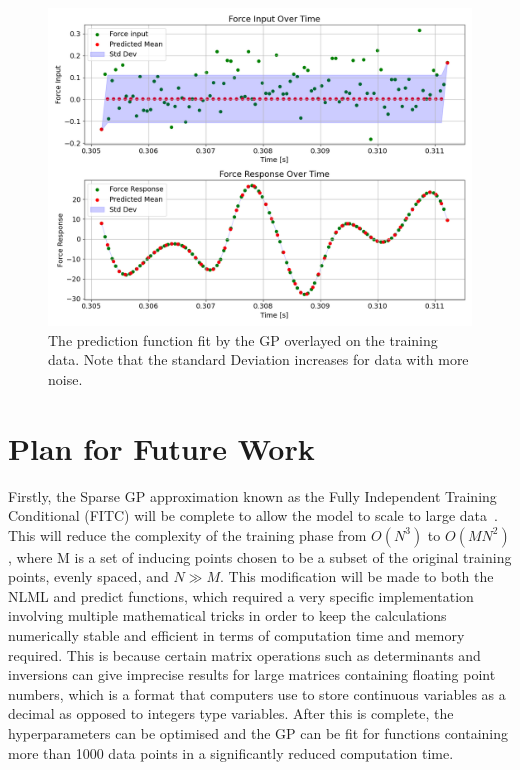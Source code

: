 \documentclass[12pt]{article}
\begin{document}
    \begin{figure}[ht]
        \centering
        \includegraphics[width=1.0\linewidth]{figures/input-response-predict/input-response-predict.png}
        \caption{The prediction function fit by the GP overlayed on the training data. Note that the standard Deviation increases for data with more noise.}
        \label{fig:input-response-predict}
    \end{figure}

    \section{Plan for Future Work}
    Firstly, the Sparse GP approximation known as the Fully Independent Training Conditional (FITC) will be complete to allow the model to scale to large data~\cite{q-candela}.
    This will reduce the complexity of the training phase from $O(N^3)$ to $O(MN^2)$, where M is a set of inducing points chosen to be a subset of the original training points, evenly spaced, and $N \gg M$.  
    This modification will be made to both the NLML and predict functions, which required a very specific implementation involving multiple mathematical tricks in order to keep the calculations numerically stable and efficient in terms of computation time and memory required.
    This is because certain matrix operations such as determinants and inversions can give imprecise results for large matrices containing floating point numbers, which is a format that computers use to store continuous variables as a decimal as opposed to integers type variables.
    After this is complete, the hyperparameters can be optimised and the GP can be fit for functions containing more than 1000 data points in a significantly reduced computation time.
\end{document}

